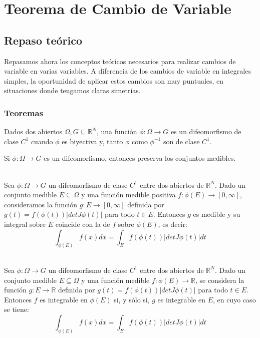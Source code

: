 \section{Teorema de Cambio de Variable}

\subsection{Repaso teórico}
Repasamos ahora los conceptos teóricos necesarios para realizar cambios de variable en varias variables. A diferencia de los cambios de variable en integrales simples, la oportunidad de aplicar estos cambios son muy puntuales, en situaciones donde tengamos claras simetrías.

\subsubsection{Teoremas}
\begin{definicion}[Difeomorfismo]
    Dados dos abiertos $\Omega, G \subseteq \mathbb{R}^N$, una función ${\phi:\Omega\to G}$ es un difeomorfismo de clase $C^1$ cuando $\phi$ es biyectiva y, tanto $\phi$ como $\phi^{-1}$ son de clase $C^1$.
\end{definicion}

\begin{prop}
    Si $\phi:\Omega\to G$ es un difeomorfismo, entonces preserva los conjuntos medibles.
\end{prop}

\begin{teo}\ \\
    Sea $\phi:\Omega\to G$ un difeomorfismo de clase $C^1$ entre dos abiertos de $\mathbb{R}^N$. Dado un conjunto medible $E\subseteq \Omega$ y una función medible positiva $f:\phi(E)\to[0,\infty]$, consideramos la función $g:E\to [0,\infty]$ definida por $g(t)=f(\phi(t))|detJ\phi(t)|$ para todo $t\in E$. Entonces $g$ es medible y su integral sobre $E$ coincide con la de $f$ sobre $\phi(E)$, es decir:
    \begin{equation*}
        \int_{\phi(E)} f(x)dx = \int_E f(\phi(t))|detJ\phi(t)|dt
    \end{equation*}
\end{teo}

\begin{teo}\ \\
    Sea $\phi:\Omega\to G$ un difeomorfismo de clase $C^1$ entre dos abiertos de $\mathbb{R}^N$. Dado un conjunto medible $E\subseteq \Omega$ y una función medible $f:\phi(E)\to\mathbb{R}$, se considera la función $g:E\to \mathbb{R}$ definida por $g(t)=f(\phi(t))|detJ\phi(t)|$ para todo $t\in E$. Entonces $f$ es integrable en $\phi(E)$ si, y sólo si, $g$ es integrable en $E$, en cuyo caso se tiene:
    \begin{equation*}
        \int_{\phi(E)} f(x)dx = \int_E f(\phi(t))|detJ\phi(t)|dt
    \end{equation*}
\end{teo}

